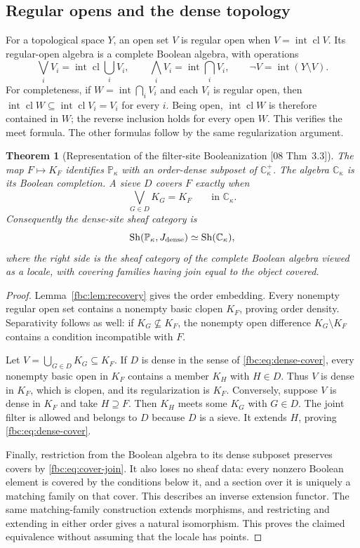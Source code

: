 \documentclass[11pt,letterpaper]{article}
\newtheorem{theorem}{Theorem}[section]
\theoremstyle{definition}
\theoremstyle{remark}
\newcommand{\C}{\mathbb C}
\newcommand{\PP}{\mathbb P}
\newcommand{\Int}{\operatorname{int}}
\newcommand{\Cl}{\operatorname{cl}}
\newcommand{\Sh}{\operatorname{Sh}}
\newcommand{\src}[1]{\textup{[#1]}}
\begin{document}
\subsection{Regular opens and the dense topology}
For a topological space $Y$, an open set $V$ is regular open when
$V=\Int\Cl V$. Its regular-open algebra is a complete Boolean algebra,
with operations
\begin{equation}\label{fbc:eq:regular-operations}
 \bigvee_i V_i=\Int\Cl\!\bigcup_iV_i,
 \qquad \bigwedge_i V_i=\Int\!\bigcap_iV_i,
 \qquad \neg V=\Int(Y\setminus V).
\end{equation}
For completeness, if $W=\Int\bigcap_iV_i$ and each $V_i$ is regular
open, then $\Int\Cl W\subseteq\Int\Cl V_i=V_i$ for every $i$.
Being open, $\Int\Cl W$ is therefore contained in $W$; the reverse
inclusion holds for every open $W$. This verifies the meet formula.
The other formulas follow by the same regularization argument.

\begin{theorem}[Representation of the filter-site Booleanization \src{08 Thm~3.3}]
\label{fbc:thm:representation}
The map $F\mapsto K_F$ identifies $\PP_\kappa$ with an order-dense
subposet of $\C_\kappa^+$. The algebra $\C_\kappa$ is its Boolean
completion. A sieve $D$ covers $F$ exactly when
\begin{equation}\label{fbc:eq:cover-join}
 \bigvee_{G\in D}K_G=K_F\qquad\text{in }\C_\kappa.
\end{equation}
Consequently the dense-site sheaf category is
\[
 \Sh(\PP_\kappa,J_{\rm dense})\simeq\Sh(\C_\kappa),
\]
where the right side is the sheaf category of the complete Boolean
algebra viewed as a locale, with covering families having join equal
to the object covered.
\end{theorem}
\begin{proof}
Lemma~\ref{fbc:lem:recovery} gives the order embedding. Every nonempty
regular open set contains a nonempty basic clopen $K_F$, proving
order density. Separativity follows as well: if $K_G\nsubseteq K_F$,
the nonempty open difference $K_G\setminus K_F$ contains a condition
incompatible with $F$.

Let $V=\bigcup_{G\in D}K_G\subseteq K_F$. If $D$ is dense in the
sense of \eqref{fbc:eq:dense-cover}, every nonempty basic open in $K_F$
contains a member $K_H$ with $H\in D$. Thus $V$ is dense in $K_F$,
which is clopen, and its regularization is $K_F$.
Conversely, suppose $V$ is dense in $K_F$ and take $H\supseteq F$.
Then $K_H$ meets some $K_G$ with $G\in D$. The joint filter is allowed
and belongs to $D$ because $D$ is a sieve. It extends $H$, proving
\eqref{fbc:eq:dense-cover}.

Finally, restriction from the Boolean algebra to its dense subposet
preserves covers by \eqref{fbc:eq:cover-join}. It also loses no sheaf data:
every nonzero Boolean element is covered by the conditions below it,
and a section over it is uniquely a matching family on that cover.
This describes an inverse extension functor. The same matching-family
construction extends morphisms, and restricting and extending in
either order gives a natural isomorphism. This proves the claimed
equivalence without assuming that the locale has points.
\end{proof}
\end{document}
